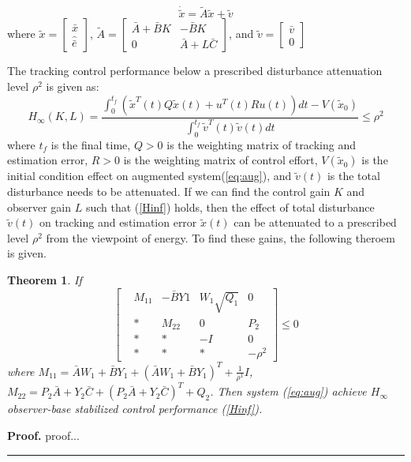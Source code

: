 \documentclass{ieeeaccess}
\newtheorem{theorem}{Theorem}
\newenvironment{proof}[1][Proof]{\noindent\textbf{#1.} }{\ \rule{0.5em}{0.5em}}
\begin{document}
\begin{equation} \label{eq:aug}
    \dot{\tilde{x}} = \tilde{A}\tilde{x}+\tilde{v}
\end{equation}
where $\tilde{x}=\begin{bmatrix}
    \bar{x} \\ \hat{\bar{e}}
\end{bmatrix}$, $\tilde{A}=\begin{bmatrix}
    \bar{A}+\bar{B}K & -\bar{B}K \\ 0 & \bar{A}+L\bar{C}
\end{bmatrix}$, and $\tilde{v}=\begin{bmatrix}
    \bar{v} \\ 0
\end{bmatrix}$

The tracking control performance below a prescribed disturbance attenuation level $\rho^2$ is given as:
\begin{equation} \label{Hinf}
    H_{\infty}(K, L) = \frac{\int_{0}^{t_f}(\tilde{x}^T(t)Q\tilde{x}(t) + u^T(t)Ru(t))dt - V(\tilde{x}_0)}{\int_{0}^{t_f}\tilde{v}^T(t)\tilde{v}(t)dt}\leq \rho^2 
\end{equation}
where $t_f$ is the final time, $Q > 0$ is the weighting matrix of tracking and estimation error, $R > 0$ is the weighting matrix of control effort, $V(\tilde{x}_0)$ is the initial condition effect on augmented system(\ref{eq:aug}), and $\tilde{v}(t)$ is the total disturbance needs to be attenuated. If we can find the control gain $K$ and observer gain $L$ such that (\ref{Hinf}) holds, then the effect of total disturbance $\tilde{v}(t)$ on tracking and estimation error $\tilde{x}(t)$ can be attenuated to a prescribed level $\rho^2$ from the viewpoint of energy. To find these gains, the following theroem is given.
\begin{theorem} \label{theorem1}
    If
    $$\begin{bmatrix}
        & M_{11} & -\bar{B}Y1 & W_1\sqrt{Q_1} & 0 \\
        & \ast  & M_{22} & 0 & P_2 \\
        & \ast & \ast & -I & 0 \\
        & \ast & \ast & \ast & -\rho^2 
    \end{bmatrix}\leq 0 $$
    where $M_{11}=\bar{A}W_1+\bar{B}Y_1 + (\bar{A}W_1+\bar{B}Y_1)^T + \frac{1}{\rho^1}I$, $M_{22}=P_2\bar{A}+Y_2\bar{C} + (P_2\bar{A}+Y_2\bar{C})^T+Q_2$. Then system (\ref{eq:aug}) achieve $H_\infty$ observer-base stabilized control performance (\ref{Hinf}).
\end{theorem}
\begin{proof}
    proof...
\end{proof}
\end{document}
